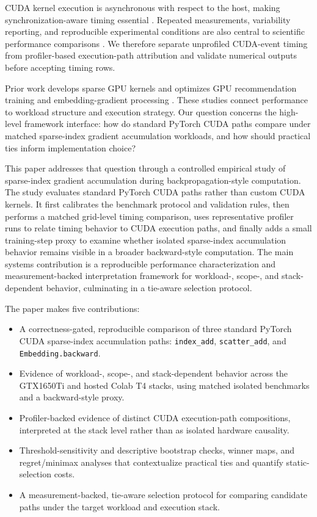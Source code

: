 CUDA kernel execution is asynchronous with respect to the host, making synchronization-aware timing essential \citep{nvidia2026cudaguide}. Repeated measurements, variability reporting, and reproducible experimental conditions are also central to scientific performance comparisons \citep{hoefler2015benchmarking}. We therefore separate unprofiled CUDA-event timing from profiler-based execution-path attribution and validate numerical outputs before accepting timing rows.

Prior work develops sparse GPU kernels \citep{gale2020sparse} and optimizes GPU recommendation training and embedding-gradient processing \citep{mudigere2022neo,liu2024embark}. These studies connect performance to workload structure and execution strategy. Our question concerns the high-level framework interface: how do standard PyTorch CUDA paths compare under matched sparse-index gradient accumulation workloads, and how should practical ties inform implementation choice?

This paper addresses that question through a controlled empirical study of sparse-index gradient accumulation during backpropagation-style computation. The study evaluates standard PyTorch CUDA paths rather than custom CUDA kernels. It first calibrates the benchmark protocol and validation rules, then performs a matched grid-level timing comparison, uses representative profiler runs to relate timing behavior to CUDA execution paths, and finally adds a small training-step proxy to examine whether isolated sparse-index accumulation behavior remains visible in a broader backward-style computation. The main systems contribution is a reproducible performance characterization and measurement-backed interpretation framework for workload-, scope-, and stack-dependent behavior, culminating in a tie-aware selection protocol.

The paper makes five contributions:
\begin{itemize}
\item A correctness-gated, reproducible comparison of three standard PyTorch CUDA sparse-index accumulation paths: \texttt{index\_\allowbreak add}, \texttt{scatter\_\allowbreak add}, and \texttt{Embedding.\allowbreak backward}.
\item Evidence of workload-, scope-, and stack-dependent behavior across the GTX1650Ti and hosted Colab T4 stacks, using matched isolated benchmarks and a backward-style proxy.
\item Profiler-backed evidence of distinct CUDA execution-path compositions, interpreted at the stack level rather than as isolated hardware causality.
\item Threshold-sensitivity and descriptive bootstrap checks, winner maps, and regret/minimax analyses that contextualize practical ties and quantify static-selection costs.
\item A measurement-backed, tie-aware selection protocol for comparing candidate paths under the target workload and execution stack.
\end{itemize}

